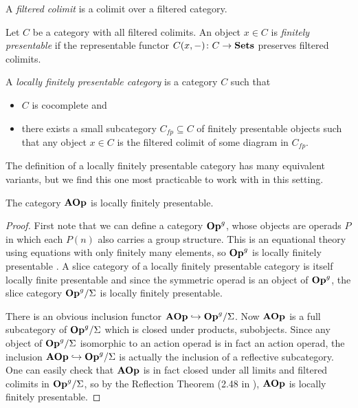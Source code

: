 \begin{Defi}
  A \emph{filtered colimit} is a colimit over a filtered category.
\end{Defi}

\begin{Defi}
  Let $C$ be a category with all filtered colimits. An object $x \in C$ is \textit{finitely presentable} if the representable functor $C(x, -) \colon C \rightarrow \mathbf{Sets}$ preserves filtered colimits.
\end{Defi}

\begin{Defi}
  A \textit{locally finitely presentable category} is a category $C$ such that
  \begin{itemize}
    \item $C$ is cocomplete and
    \item there exists a small subcategory $C_{fp} \subseteq C$ of finitely presentable objects such that any object $x \in C$ is the filtered colimit of some diagram in $C_{fp}$.
  \end{itemize}
\end{Defi}

The definition of a locally finitely presentable category has many equivalent variants, but we find this one most practicable to work with in this setting.

\begin{thm}
The category $\mathbf{AOp}$ is locally finitely presentable.
\end{thm}
\begin{proof}
First note that we can define a category $\mathbf{Op}^{g}$, whose objects are operads $P$ in which each $P(n)$ also carries a group structure. This is an equational theory using equations with only finitely many elements, so $\mathbf{Op}^{g}$ is locally finitely presentable \cite[Corollary 3.7]{ar}. A slice category of a locally finitely presentable category is itself locally finite presentable \cite[Proposition 1.57]{ar} and since the symmetric operad is an object of $\mathbf{Op}^{g}$, the slice category $\mathbf{Op}^{g}/\Sigma$ is locally finitely presentable.

There is an obvious inclusion functor $\mathbf{AOp} \hookrightarrow \mathbf{Op}^{g}/\Sigma$. Now $\mathbf{AOp}$ is a full subcategory of $\mathbf{Op}^{g}/\Sigma$ which is closed under products, subobjects. Since any object of $\mathbf{Op}^{g}/\Sigma$ isomorphic to an action operad is in fact an action operad, the inclusion   $\mathbf{AOp} \hookrightarrow \mathbf{Op}^{g}/\Sigma$ is actually the inclusion of a reflective subcategory. One can easily check that $\mathbf{AOp}$ is in fact closed under all limits and filtered colimits in $\mathbf{Op}^{g}/\Sigma$, so by the Reflection Theorem (2.48 in \cite{ar}), $\mathbf{AOp}$ is locally finitely presentable.
\end{proof}


